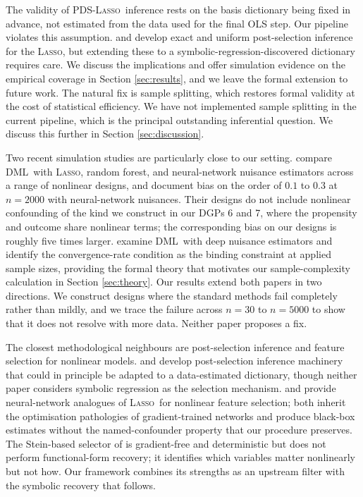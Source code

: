 \documentclass[11pt, a4paper]{article}
\theoremstyle{plain}
\theoremstyle{definition}
\theoremstyle{remark}
\newcommand{\lasso}{\textsc{Lasso}}
\newcommand{\pds}{\textsc{PDS}}
\newcommand{\dml}{\textsc{DML}}
\begin{document}
The validity of \pds-\lasso\ inference rests on the basis
dictionary being fixed in advance, not estimated from the data
used for the final OLS step. Our pipeline violates this
assumption. \citet{lee2016exact} and \citet{tibshirani2018uniform}
develop exact and uniform post-selection inference for the
\lasso, but extending these to a symbolic-regression-discovered
dictionary requires care. We discuss the implications and offer
simulation evidence on the empirical coverage in Section
\ref{sec:results}, and we leave the formal extension to future
work. The natural fix is sample splitting, which restores formal
validity at the cost of statistical efficiency. We have not
implemented sample splitting in the current pipeline, which is
the principal outstanding inferential question. We discuss this
further in Section \ref{sec:discussion}.

Two recent simulation studies are particularly close to our
setting. \citet{fuhr2024} compare \dml\ with \lasso, random
forest, and neural-network nuisance estimators across a range
of nonlinear designs, and document bias on the order of $0.1$
to $0.3$ at $n=2000$ with neural-network nuisances. Their
designs do not include nonlinear confounding of the kind we
construct in our DGPs 6 and 7, where the propensity and outcome
share nonlinear terms; the corresponding bias on our designs is
roughly five times larger. \citet{klusowski2024doubledeep}
examine \dml\ with deep nuisance estimators and identify the
convergence-rate condition as the binding constraint at applied
sample sizes, providing the formal theory that motivates our
sample-complexity calculation in Section \ref{sec:theory}. Our
results extend both papers in two directions. We construct
designs where the standard methods fail completely rather than
mildly, and we trace the failure across $n=30$ to $n=5000$ to
show that it does not resolve with more data. Neither paper
proposes a fix.

The closest methodological neighbours are post-selection
inference and feature selection for nonlinear models.
\citet{lee2016exact} and \citet{tibshirani2018uniform} develop
post-selection inference machinery that could in principle be
adapted to a data-estimated dictionary, though neither paper
considers symbolic regression as the selection mechanism.
\citet{lemhadri2021lassonet} and \citet{chen2021dfs} provide
neural-network analogues of \lasso\ for nonlinear feature
selection; both inherit the optimisation pathologies of
gradient-trained networks and produce black-box estimates
without the named-confounder property that our procedure
preserves. The Stein-based selector of \citet{duetal2025} is
gradient-free and deterministic but does not perform
functional-form recovery; it identifies which variables matter
nonlinearly but not how. Our framework combines its strengths
as an upstream filter with the symbolic recovery that follows.
\end{document}
